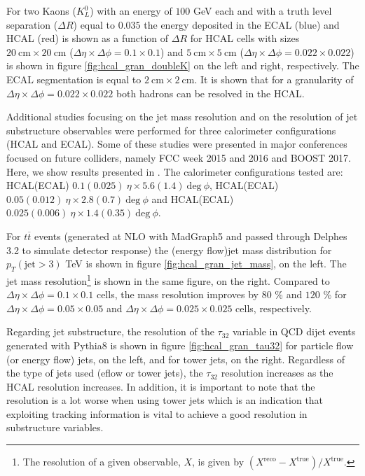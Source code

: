 For two Kaons ($K_L^0$) with an energy of $100$ GeV each and with a truth level separation ($\Delta R$) equal to $0.035$ the energy deposited in the ECAL (blue) and HCAL (red) is shown as a function of $\Delta R$ for HCAL cells with sizes $20~\text{cm}\times 20~\text{cm}$ ($\Delta \eta\times \Delta\phi=0.1\times 0.1$) and $5~\text{cm}\times 5~\text{cm}$ ($\Delta \eta\times \Delta\phi=0.022\times 0.022$) is shown in figure \ref{fig:hcal_gran_doubleK} on the left and right, respectively. The ECAL segmentation is equal to $2~\text{cm}\times 2~\text{cm}$. It is shown that for a granularity of $\Delta \eta\times \Delta\phi=0.022\times 0.022$ both hadrons can be resolved in the HCAL.

Additional studies focusing on the jet mass resolution and on the resolution of jet substructure observables were performed for three calorimeter configurations (HCAL and ECAL). Some of these studies were presented in major conferences focused on future colliders, namely FCC week 2015 and 2016 and BOOST 2017. Here, we show results presented in \cite{FCCweek2015,FCCweek2016,BOOST2017}. The calorimeter configurations tested are: HCAL(ECAL) $0.1(0.025)~\eta \times 5.6(1.4)~\text{deg}~\phi$, HCAL(ECAL) $0.05(0.012)~\eta \times 2.8(0.7)~\text{deg}~\phi$ and HCAL(ECAL) $0.025(0.006)~\eta \times 1.4(0.35)~\text{deg}~\phi$. 

For $t\overline{t}$ events (generated at NLO with MadGraph5 and passed through Delphes 3.2 to simulate detector response) the (energy flow)jet mass distribution for $p_T(\text{jet}>3)$ TeV is shown in figure \ref{fig:hcal_gran_jet_mass}, on the left. The jet mass resolution\footnote{The resolution of a given observable, $X$, is given by $(X^{\text{reco}}-X^{\text{true}})/X^{\text{true}}$.} is shown in the same figure, on the right. Compared to $\Delta\eta\times\Delta\phi=0.1\times0.1$ cells, the mass resolution improves by $80$ \% and $120$ \% for $\Delta\eta\times\Delta\phi=0.05\times0.05$ and $\Delta\eta\times\Delta\phi=0.025\times0.025$ cells, respectively.

Regarding jet substructure, the resolution of the $\tau_{32}$ variable in QCD dijet events generated with Pythia8 is shown in figure \ref{fig:hcal_gran_tau32} for particle flow (or energy flow) jets, on the left, and for tower jets, on the right. Regardless of the type of jets used (eflow or tower jets), the $\tau_{32}$ resolution increases as the HCAL resolution increases. In addition, it is important to note that the resolution is a lot worse when using tower jets which is an indication that exploiting tracking information is vital to achieve a good resolution in substructure variables. 


